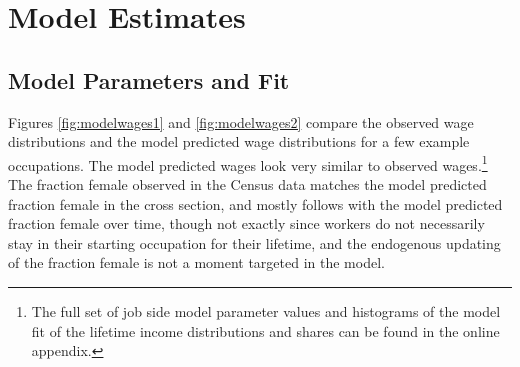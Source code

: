\documentclass[12pt]{article}
\begin{document}












\section{Model Estimates} \label{results}
\subsection{Model Parameters and Fit}


Figures \ref{fig:modelwages1} and \ref{fig:modelwages2} compare the observed wage distributions and the model predicted wage distributions for a few example occupations. The model predicted wages look very similar to observed wages.\footnote{The full set of job side model parameter values and histograms of the model fit of the lifetime income distributions and shares can be found in the online appendix.} The fraction female observed in the Census data matches the model predicted fraction female in the cross section, and mostly follows with the model predicted fraction female over time, though not exactly since workers do not necessarily stay in their starting occupation for their lifetime, and the endogenous updating of the fraction female is not a moment targeted in the model.
\end{document}
